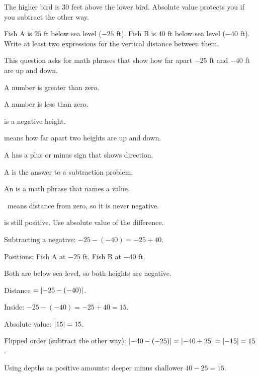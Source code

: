 
The higher bird is $30$ feet above the lower bird. Absolute value protects you if you subtract the other way.


Fish A is $25$ ft below sea level ($-25$ ft). Fish B is $40$ ft below sea level ($-40$ ft). Write at least two expressions for the vertical distance between them.


This question asks for math phrases that show how far apart $-25$ ft and $-40$ ft are up and down.

\begin{words}
  \item A number is greater than zero.
  \item A number is less than zero.
  \item {}is a negative height.
  \item {}means how far apart two heights are up and down.
  \item A has a plus or minus sign that shows direction.
  \item A is the answer to a subtraction problem.
  \item An is a math phrase that names a value.
  \item {}\barsym\ means distance from zero, so it is never negative.
  \item {}is still positive. Use absolute value of the difference.
  \item Subtracting a negative: $-25 - (-40) = -25 + 40$.
\end{words}

\begin{steps}
  \item Positions: Fish A at $-25$ ft. Fish B at $-40$ ft.
  \item Both are below sea level, so both heights are negative.
  \item Distance $= \left\lvert -25-(-40) \right\rvert$.
  \item Inside: $-25 - (-40) = -25 + 40 = 15$.
  \item Absolute value: $\left\lvert 15 \right\rvert = 15$.
  \item Flipped order (subtract the other way): $\left\lvert -40-(-25) \right\rvert = \left\lvert -40+25 \right\rvert = \left\lvert -15 \right\rvert = 15$.
  \item Using depths as positive amounts: deeper minus shallower $40 - 25 = 15$.
\end{steps}


